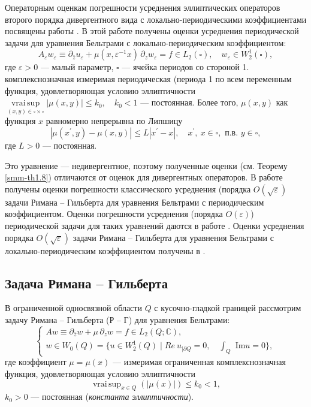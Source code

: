 Операторным оценкам погрешности усреднения  эллиптических операторов второго порядка дивергентного вида  с локально-периодическими коэффициентами посвящены работы \cite{smm-4,smm-5,smm-6,smm-7}.
В этой работе получены оценки усреднения периодической задачи  для уравнения Бельтрами с локально-периодическим коэффициентом:
$$
	A_\varepsilon w_\varepsilon\equiv\partial_{\bar{z}}u_\varepsilon+\mu(x,\varepsilon^{-1}x)\,\partial_z w_\varepsilon
=f\in L_2(\square),\quad w_\varepsilon\in W_2^1(\square),
$$
где $\varepsilon>0$ --- малый параметр, $\square$ --- ячейка периодов со стороной 1.
комплекснозначная измеримая периодическая (периода 1 по всем переменным   функция, удовлетворяющая условию эллиптичности
 $\mathop{vrai\, sup}\limits_{(x,y)\in\square\times\square}|\mu(x,y)|\leqslant k_0,\quad k_0<1$  --- постоянная.
 Более того, $\mu(x,y)$  как функция $x$ равномерно непрерывна по Липшицу
$$
|\mu(x^\prime,y)-\mu(x,y)|\leqslant L|x^\prime-x|,\quad x^\prime,\ x\in\square,  \text{ \ п.в.\ }   y\in\square,
$$
где $L>0$ --- постоянная.

Это уравнение --- недивергентное, поэтому полученные оценки (см. Теорему \ref{smm-th1.8}) отличаются от оценок для дивергентных операторов.
В работе \cite{smm-8} получены оценки погрешности классического усреднения (порядка  $O(\sqrt\varepsilon)$ задачи Римана -- Гильберта  для уравнения Бельтрами с периодическим коэффициентом. Оценки погрешности усреднения (порядка $O(\varepsilon)$) периодической задачи для таких уравнений даются в работе \cite{smm-9}.  Оценки усреднения  порядка $O(\sqrt\varepsilon)$  задачи Римана -- Гильберта для уравнения Бельтрами с локально-периодическим коэффициентом получены  в \cite{smm-10}.



 \subsection{Задача Римана -- Гильберта}
 В ограниченной односвязной области $Q$ с кусочно-гладкой границей рассмотрим задачу Римана -- Гильберта (Р -- Г) для уравнения Бельтрами:
\begin{equation}\label{smm-f:1.001}
	\left\{\begin{array}{l}
		A w\equiv\partial_{\bar{z}}w+\mu\,\partial_z w=f\in L_2(Q;\mathbb{C}), \\[3mm]
		w\in W_0(Q)=\{u\in W_2^1(Q) \mid { Re\ u}_{|\partial Q}=0,\quad \int_Q\text{ Im} u=0\},
	\end{array}\right.
\end{equation}
где коэффициент $\mu=\mu(x)$ --- измеримая ограниченная комплекснозначная функция, удовлетворяющая условию эллиптичности
\begin{equation}\label{smm-f:1.2}
	\mathop{vrai\,sup}_{x\in Q}\left(|\mu(x)|\right)\leqslant k_0 <1,
\end{equation}
$k_0>0$ --- постоянная (\textit{константа эллиптичности}).

